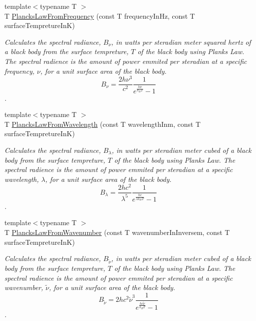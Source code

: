 \begin{DoxyCompactItemize}
{\footnotesize template$<$typename T $>$ }\\T \mbox{\hyperlink{group___e_g_x_phys-_electrodynamics-_black_body-_plancks_law_ga68aae82f8a086831358c4a61c8c80ba4}{Plancks\+Law\+From\+Frequency}} (const T frequency\+In\+Hz, const T surface\+Tempreture\+InK)
\begin{DoxyCompactList}\small\item\em Calculates the spectral radiance, $B_{\nu}$, in watts per steradian meter squared hertz of a black body from the surface tempreture, $T$ of the black body using Plank\textquotesingle{}s Law. The spectral radience is the amount of power emmited per steradian at a specific frequency, $\nu$, for a unit surface area of the black body. \[ B_{\nu} = \dfrac{2 h \nu^3}{c^2} \dfrac{1}{e^{\frac{h\nu}{k_B T}} - 1} \]. \end{DoxyCompactList}\item 
{\footnotesize template$<$typename T $>$ }\\T \mbox{\hyperlink{group___e_g_x_phys-_electrodynamics-_black_body-_plancks_law_ga54639bc031ded51ef78aa82b0457a4dd}{Plancks\+Law\+From\+Wavelength}} (const T wavelength\+Inm, const T surface\+Tempreture\+InK)
\begin{DoxyCompactList}\small\item\em Calculates the spectral radiance, $B_{\lambda}$, in watts per steradian meter cubed of a black body from the surface tempreture, $T$ of the black body using Plank\textquotesingle{}s Law. The spectral radience is the amount of power emmited per steradian at a specific wavelength, $\lambda$, for a unit surface area of the black body. \[ B_{\lambda} = \dfrac{2 h c^2}{\lambda^5} \dfrac{1}{e^{\frac{hc}{\lambda k_B T}} - 1} \]. \end{DoxyCompactList}\item 
{\footnotesize template$<$typename T $>$ }\\T \mbox{\hyperlink{group___e_g_x_phys-_electrodynamics-_black_body-_plancks_law_ga6648ae2a0fbff6735c1e1a04c7cac746}{Plancks\+Law\+From\+Wavenumber}} (const T wavenumber\+In\+Inversem, const T surface\+Tempreture\+InK)
\begin{DoxyCompactList}\small\item\em Calculates the spectral radiance, $B_{\tilde {\nu }}$, in watts per steradian meter cubed of a black body from the surface tempreture, $T$ of the black body using Plank\textquotesingle{}s Law. The spectral radience is the amount of power emmited per steradian at a specific wavenumber, $\tilde {\nu }$, for a unit surface area of the black body. \[ B_{\tilde {\nu }} = 2 h c^2 \tilde {\nu }^3 \dfrac{1}{e^{\frac{hc \tilde {\nu }}{k_B T}} - 1} \]. \end{DoxyCompactList}\item 

\end{DoxyCompactItemize}

